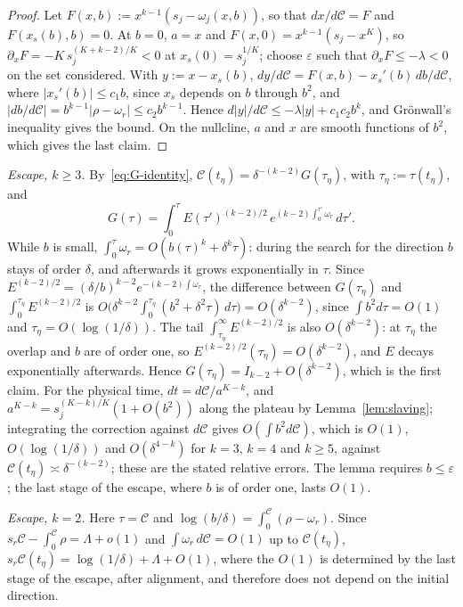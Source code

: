 \documentclass[11pt]{article}
\newcommand{\Clk}{\mathcal{C}}
\theoremstyle{definition}
\numberwithin{equation}{section}
\begin{document}
\begin{proof}
Let $F(x,b):=x^{k-1}(s_j-\omega_j(x,b))$, so that $dx/d\Clk=F$ and $F(x_s(b),b)=0$. At $b=0$, $a=x$ and $F(x,0)=x^{k-1}(s_j-x^K)$, so $\partial_xF=-K\,s_j^{(K+k-2)/K}<0$ at $x_s(0)=s_j^{1/K}$; choose $\varepsilon$ such that $\partial_xF\le-\lambda<0$ on the set considered. With $y:=x-x_s(b)$, $dy/d\Clk=F(x,b)-x_s'(b)\,db/d\Clk$, where $|x_s'(b)|\le c_1b$, since $x_s$ depends on $b$ through $b^2$, and $|db/d\Clk|=b^{k-1}|\rho-\omega_r|\le c_2b^{k-1}$. Hence $d|y|/d\Clk\le-\lambda|y|+c_1c_2b^k$, and Grönwall's inequality gives the bound. On the nullcline, $a$ and $x$ are smooth functions of $b^2$, which gives the last claim.
\end{proof}

\emph{Escape, $k\ge3$.} By~\eqref{eq:G-identity}, $\Clk(t_\eta)=\delta^{-(k-2)}G(\tau_\eta)$, with $\tau_\eta:=\tau(t_\eta)$, and
\[
G(\tau)=\int_0^\tau E(\tau')^{(k-2)/2}\,e^{(k-2)\int_0^{\tau'}\omega_r}\,d\tau'.
\]
While $b$ is small, $\int_0^\tau\omega_r=O(b(\tau)^k+\delta^k\tau)$: during the search for the direction $b$ stays of order $\delta$, and afterwards it grows exponentially in $\tau$. Since $E^{(k-2)/2}=(\delta/b)^{k-2}e^{-(k-2)\int\omega_r}$, the difference between $G(\tau_\eta)$ and $\int_0^{\tau_\eta}E^{(k-2)/2}$ is $O\big(\delta^{k-2}\int_0^{\tau_\eta}(b^2+\delta^2\tau)\,d\tau\big)=O(\delta^{k-2})$, since $\int b^2d\tau=O(1)$ and $\tau_\eta=O(\log(1/\delta))$. The tail $\int_{\tau_\eta}^\infty E^{(k-2)/2}$ is also $O(\delta^{k-2})$: at $\tau_\eta$ the overlap and $b$ are of order one, so $E^{(k-2)/2}(\tau_\eta)=O(\delta^{k-2})$, and $E$ decays exponentially afterwards. Hence $G(\tau_\eta)=I_{k-2}+O(\delta^{k-2})$, which is the first claim. For the physical time, $dt=d\Clk/a^{K-k}$, and $a^{K-k}=s_j^{(K-k)/K}(1+O(b^2))$ along the plateau by Lemma~\ref{lem:slaving}; integrating the correction against $d\Clk$ gives $O(\int b^2d\Clk)$, which is $O(1)$, $O(\log(1/\delta))$ and $O(\delta^{4-k})$ for $k=3$, $k=4$ and $k\ge5$, against $\Clk(t_\eta)\asymp\delta^{-(k-2)}$; these are the stated relative errors. The lemma requires $b\le\varepsilon$; the last stage of the escape, where $b$ is of order one, lasts $O(1)$.

\emph{Escape, $k=2$.} Here $\tau=\Clk$ and $\log(b/\delta)=\int_0^{\Clk}(\rho-\omega_r)$. Since $s_r\Clk-\int_0^{\Clk}\rho=\Lambda+o(1)$ and $\int\omega_r\,d\Clk=O(1)$ up to $\Clk(t_\eta)$, $s_r\Clk(t_\eta)=\log(1/\delta)+\Lambda+O(1)$, where the $O(1)$ is determined by the last stage of the escape, after alignment, and therefore does not depend on the initial direction.
\end{document}
